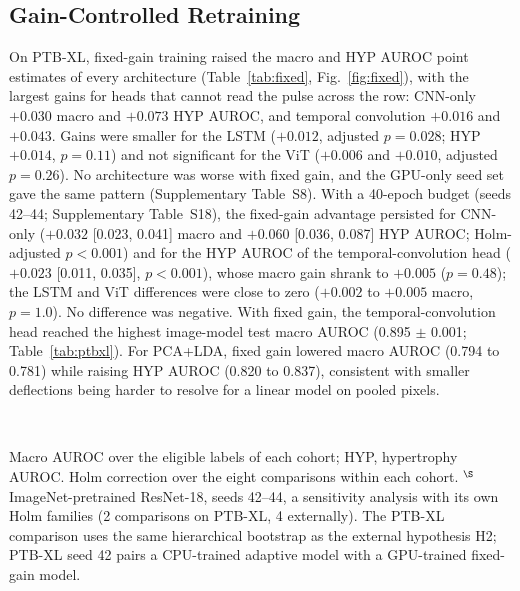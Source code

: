 \documentclass[journal]{IEEEtran}
\begin{document}
\subsection{Gain-Controlled Retraining}
On PTB-XL, fixed-gain training raised the macro and HYP AUROC point estimates of every architecture (Table~\ref{tab:fixed}, Fig.~\ref{fig:fixed}), with the largest gains for heads that cannot read the pulse across the row: CNN-only $+0.030$ macro and $+0.073$ HYP AUROC, and temporal convolution $+0.016$ and $+0.043$. Gains were smaller for the LSTM ($+0.012$, adjusted $p=0.028$; HYP $+0.014$, $p=0.11$) and not significant for the ViT ($+0.006$ and $+0.010$, adjusted $p=0.26$). No architecture was worse with fixed gain, and the GPU-only seed set gave the same pattern (Supplementary Table~S8). With a 40-epoch budget (seeds 42--44; Supplementary Table~S18), the fixed-gain advantage persisted for CNN-only ($+0.032$ [0.023, 0.041] macro and $+0.060$ [0.036, 0.087] HYP AUROC; Holm-adjusted $p<0.001$) and for the HYP AUROC of the temporal-convolution head ($+0.023$ [0.011, 0.035], $p<0.001$), whose macro gain shrank to $+0.005$ ($p=0.48$); the LSTM and ViT differences were close to zero ($+0.002$ to $+0.005$ macro, $p=1.0$). No difference was negative. With fixed gain, the temporal-convolution head reached the highest image-model test macro AUROC (0.895 $\pm$ 0.001; Table~\ref{tab:ptbxl}). For PCA+LDA, fixed gain lowered macro AUROC (0.794 to 0.781) while raising HYP AUROC (0.820 to 0.837), consistent with smaller deflections being harder to resolve for a linear model on pooled pixels.

\begin{table}[!t]
\centering
\caption{Fixed-Gain Minus Adaptive-Gain Training: Difference in Mean-Over-Seeds AUROC [95\% CI] and Holm-Adjusted $p$ (Seeds 42--46)}
\label{tab:fixed}
\\[2pt]
\begin{minipage}{0.95\textwidth}\scriptsize
Macro AUROC over the eligible labels of each cohort; HYP, hypertrophy AUROC. Holm correction over the eight comparisons within each cohort. $^\S$ImageNet-pretrained ResNet-18, seeds 42--44, a sensitivity analysis with its own Holm families (2 comparisons on PTB-XL, 4 externally). The PTB-XL comparison uses the same hierarchical bootstrap as the external hypothesis H2; PTB-XL seed 42 pairs a CPU-trained adaptive model with a GPU-trained fixed-gain model.
\end{minipage}
\end{table}
\end{document}
